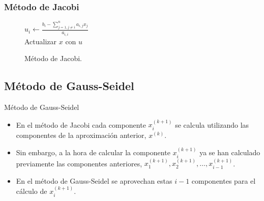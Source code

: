 \documentclass[10pt]{beamer}
\begin{document}
  \begin{frame}
  \frametitle{M\'etodo de Jacobi}
  \begin{center}  
  \begin{figure}[h]            
    \begin{algorithm}[H]     
     \caption{M\'etodo de Jacobi.}
     {
      {
        $u_i \leftarrow \displaystyle\frac{b_i-\displaystyle\sum_{j=1,j\neq i}^na_{i,j}x_j}{a_{i,i}}$\\
      }
      Actualizar $x$ con $u$\\
     }    
    \end{algorithm}
    \end{figure}
  \end{center}
  \end{frame}
  \subsection{M\'etodo de Gauss-Seidel}
  \begin{frame}{M\'etodo de Gauss-Seidel}
  \begin{itemize}
    \item<1-> En el m\'etodo de Jacobi cada componente $x_i^{(k+1)}$ se calcula utilizando las componentes de la aproximaci\'on anterior, $x^{(k)}$.
 \item<2-> Sin embargo, a la hora de calcular la componente $x_i^{(k+1)}$ ya se han calculado previamente las componentes anteriores, $x_1^{(k+1)}, x_2^{(k+1)},\ldots, x_{i-1}^{(k+1)}$.
 \item<3-> En el m\'etodo de Gauss-Seidel se aprovechan estas $i-1$ componentes para el c\'alculo de $x_i^{(k+1)}$.
 \end{itemize}
  \end{frame}
\end{document}
